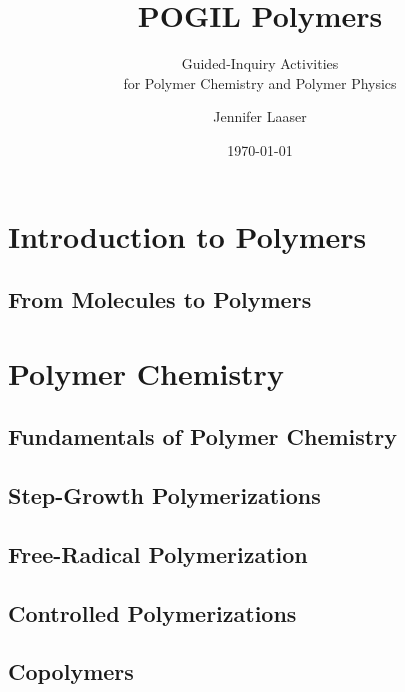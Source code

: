 \documentclass[book]{pogil}
\author{Jennifer Laaser}
\title{POGIL Polymers}
\subtitle{Guided-Inquiry Activities \\for Polymer Chemistry and Polymer Physics}
\date{\today}
\begin{document}
\frontmatter
\pagestyle{empty}
\titlepage
\clearpage

\copyrightpage
\clearpage

\tableofcontents*
\clearpage



\mainmatter
\pagestyle{fancy}

\part{Introduction to Polymers}

	\chapter{From Molecules to Polymers}
		

\part{Polymer Chemistry}

	\chapter{Fundamentals of Polymer Chemistry}

	\chapter{Step-Growth Polymerizations}
		
		

	\chapter{Free-Radical Polymerization}

	\chapter{Controlled Polymerizations}

	\chapter{Copolymers}
\end{document}
